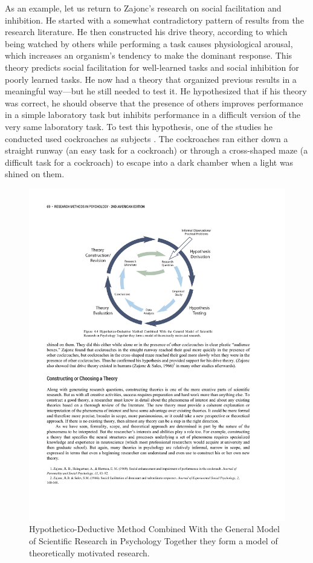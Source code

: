 As an example, let us return to Zajonc's research on social facilitation and inhibition. He started with a somewhat contradictory pattern of results from the research literature. He then constructed his drive theory, according to which being watched by others while performing a task causes physiological arousal, which increases an organism's tendency to make the dominant response. This theory predicts social facilitation for well-learned tasks and social inhibition for poorly learned tasks. He now had a theory that organized previous results in a meaningful way---but he still needed to test it. He hypothesized that if his theory was correct, he should observe that the presence of others improves performance in a simple laboratory task but inhibits performance in a difficult version of the very same laboratory task. To test this hypothesis, one of the studies he conducted used cockroaches as subjects \citep{zajonc_social_1969}. The cockroaches ran either down a straight runway (an easy task for a cockroach) or through a cross-shaped maze (a difficult task for a cockroach) to escape into a dark chamber when a light was shined on them.


\begin{figure}
      \includegraphics[width=\linewidth]{figures/C4Theory.pdf}
      \caption{Hypothetico-Deductive Method Combined With the General Model of Scientific Research in Psychology Together they form a model of theoretically motivated research.
}
      \label{fig:Theory}
\end{figure}

